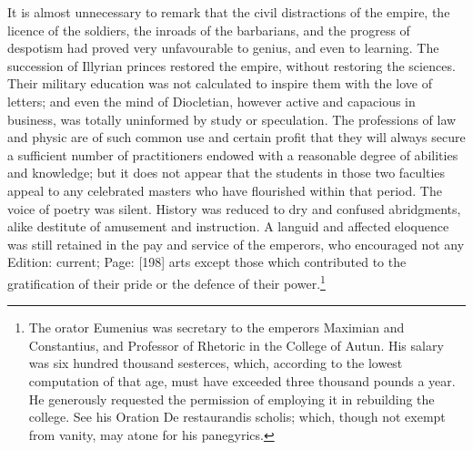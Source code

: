 It is almost unnecessary to remark that the civil distractions of the empire, the licence of the soldiers, the inroads of the barbarians, and the progress of despotism had proved very unfavourable to genius, and even to learning. The succession of Illyrian princes restored the empire, without restoring the sciences. Their military education was not calculated to inspire them with the love of letters; and even the mind of Diocletian, however active and capacious in business, was totally uninformed by study or speculation. The professions of law and physic are of such common use and certain profit that they will always secure a sufficient number of practitioners endowed with a reasonable degree of abilities and knowledge; but it does not appear that the students in those two faculties appeal to any celebrated masters who have flourished within that period. The voice of poetry was silent. History was reduced to dry and confused abridgments, alike destitute of amusement and instruction. A languid and affected eloquence was still retained in the pay and service of the emperors, who encouraged not any Edition: current; Page: [198] arts except those which contributed to the gratification of their pride or the defence of their power.\footnote{The orator Eumenius was secretary to the emperors Maximian and Constantius, and Professor of Rhetoric in the College of Autun. His salary was six hundred thousand sesterces, which, according to the lowest computation of that age, must have exceeded three thousand pounds a year. He generously requested the permission of employing it in rebuilding the college. See his Oration De restaurandis scholis; which, though not exempt from vanity, may atone for his panegyrics.}

